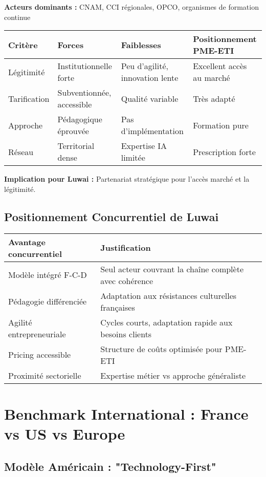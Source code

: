 \textbf{Acteurs dominants :} CNAM, CCI régionales, OPCO, organismes de formation continue

\begin{longtable}{@{}p{3cm}p{4cm}p{4cm}p{4cm}@{}}
\toprule
\textbf{Critère} & \textbf{Forces} & \textbf{Faiblesses} & \textbf{Positionnement PME-ETI} \\
\midrule
Légitimité & Institutionnelle forte & Peu d'agilité, innovation lente & Excellent accès au marché \\
Tarification & Subventionnée, accessible & Qualité variable & Très adapté \\
Approche & Pédagogique éprouvée & Pas d'implémentation & Formation pure \\
Réseau & Territorial dense & Expertise IA limitée & Prescription forte \\
\bottomrule
\end{longtable}

\textbf{Implication pour Luwai :} Partenariat stratégique pour l'accès marché et la légitimité.

\subsection{Positionnement Concurrentiel de Luwai}

\begin{longtable}{@{}p{4cm}p{10cm}@{}}
\toprule
\textbf{Avantage concurrentiel} & \textbf{Justification} \\
\midrule
Modèle intégré F-C-D & Seul acteur couvrant la chaîne complète avec cohérence \\
Pédagogie différenciée & Adaptation aux résistances culturelles françaises \\
Agilité entrepreneuriale & Cycles courts, adaptation rapide aux besoins clients \\
Pricing accessible & Structure de coûts optimisée pour PME-ETI \\
Proximité sectorielle & Expertise métier vs approche généraliste \\
\bottomrule
\end{longtable}

\section{Benchmark International : France vs US vs Europe}

\subsection{Modèle Américain : "Technology-First"}

